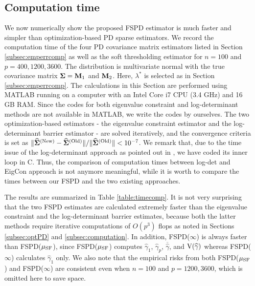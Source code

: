 \documentclass[times,sort&compress,3p]{elsarticle}
\begin{document}
\subsection{Computation time}\label{subsec:timecomp}


We now numerically show the proposed FSPD estimator is much faster and simpler than optimization-based 
PD sparse estimators. We record the computation time of the four PD covariance matrix estimators  listed 
in Section \ref{subsec:emperrcomp} as well as the soft thresholding estimator for $n=100$ and $p=400,1200,3600$.
The distribution is multivariate normal with the true covariance matrix
${\bf \Sigma}={\bf M}_1$ and ${\bf M}_2$. Here, $\lambda^*$ is selected as in
Section \ref{subsec:emperrcomp}. The calculations in this Section are performed using \textsf{MATLAB} running
on a computer with an Intel Core i7 CPU (3.4 GHz) and 16 GB RAM. Since the codes for both eigenvalue constraint and log-determinant methods are not available in \textsf{MATLAB}, we write the codes by ourselves.
The two optimization-based estimators - the eigenvalue
 constraint estimator and the log-determinant barrier estimator - are solved iteratively, and the convergence criteria is set as
  $\|\widehat{\bf \Sigma}^{\rm (New)} - \widehat{\bf \Sigma}^{\rm (Old)}\| / \|\widehat{\bf\Sigma}^{\rm (Old)}\| < 10^{-7}$. 
 We remark that, 
due to the time issue of the log-determinant approach as pointed out in \citet{Xue2012}, we have coded its inner loop in C.  Thus, the comparison  of computation times 
between log-det and EigCon approach is not anymore meaningful, 
while it is worth to compare the times between our FSPD and the two existing approaches.




The results are summarized in Table \ref{table:timecomp}. It is not very surprising that the two FSPD estimates are
calculated extremely faster than the eigenvalue constraint and the log-determinant barrier estimates, because
 both the latter methods require iterative computations of $O(p^3)$ flops as noted in Sections \ref{subsec:optPD}
 and \ref{subsec:computation}.
In addition, FSPD($\infty$) is always faster than FSPD($\mu_{\rm SF}$), since
FSPD($\mu_{\rm SF}$) computes $\widehat{\gamma}_{1}$, $\widehat{\gamma}_{p}$, $\overline{\widehat{\gamma}}$,
 and ${\rm V}(\widehat{\gamma})$ whereas FSPD($\infty$) calculates $\widehat{\gamma}_{1}$ only.
We also note that the empirical risks from both FSPD($\mu_{\rm SF}$) and FSPD($\infty$) are
 consistent even when $n=100$ and $p=1200,3600$, which is omitted here to save space.
\end{document}
